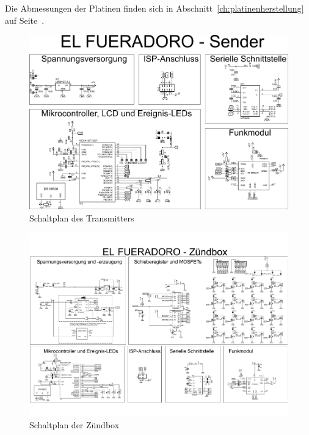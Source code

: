\documentclass[paper=a4, parskip, numbers=noenddot, toc=listof, headsepline]{scrbook}
\begin{document}
		Die Abmessungen der Platinen finden sich in Abschnitt~\ref{ch:platinenherstellung} auf Seite~\pageref{ch:platinenherstellung}.

		\begin{figure}
			\centering
			\includegraphics[angle=-90, width=.9\textwidth, keepaspectratio]{Bilder/Transmitterschaltplan}
			\caption{Schaltplan des Transmitters}
			\label{fig:transmitterschematic}
		\end{figure}

		\begin{figure}
			\centering
			\includegraphics[angle=90, height=.95\textheight,keepaspectratio]{Bilder/Zuendboxschaltplan}
			\caption{Schaltplan der Zündbox}
			\label{fig:zuendboxschematic}
		\end{figure}
\end{document}
